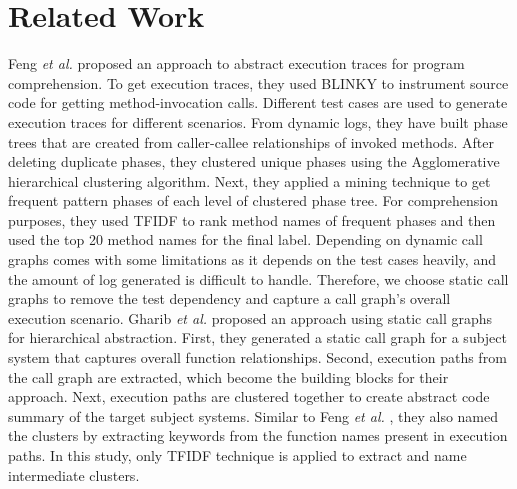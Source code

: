 \section{Related Work}
\label{relatedwork}
Feng \textit{et al.} \cite{feng2018dynamic} proposed an approach to abstract execution traces for program comprehension. To get execution traces, they used BLINKY to instrument source code for getting method-invocation calls. Different test cases are used to generate execution traces for different scenarios. From dynamic logs, they have built phase trees that are created from caller-callee relationships of invoked methods. After deleting duplicate phases, they clustered unique phases using the Agglomerative hierarchical clustering algorithm. Next, they applied a mining technique to get frequent pattern phases of each level of clustered phase tree. For comprehension purposes, they used TFIDF to rank method names of frequent phases and then used the top 20 method names for the final label. Depending on dynamic call graphs comes with some limitations as it depends on the test cases heavily, and the amount of log generated is difficult to handle. Therefore, we choose static call graphs to remove the test dependency and capture a call graph's overall execution scenario. Gharib \textit{et al.}  \cite{gharibi2018automatic} proposed an approach using static call graphs for hierarchical abstraction. First, they generated a static call graph for a subject system that captures overall function relationships. Second, execution paths from the call graph are extracted, which become the building blocks for their approach. Next, execution paths are clustered together to create abstract code summary of the target subject systems. Similar to Feng \textit{et al.}  \cite{feng2018dynamic}, they also named the clusters by extracting keywords from the function names present in execution paths. In this study, only TFIDF technique is applied to extract and name intermediate clusters.


